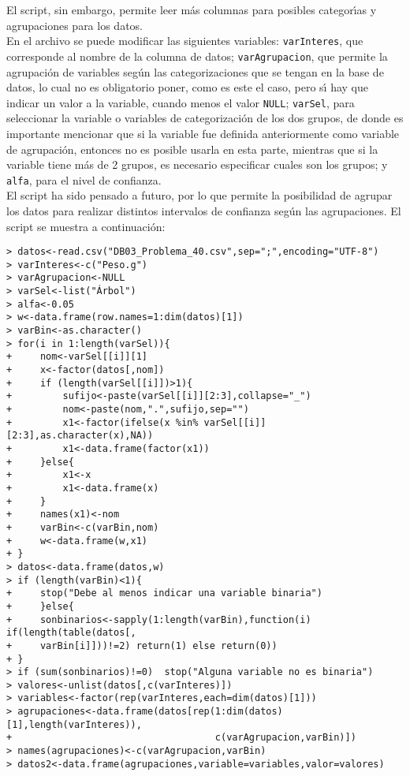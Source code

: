 \begin{solucion}
 El script, sin embargo, permite leer m\'as columnas para posibles categor\'{\i}as y agrupaciones para los datos. \\
 En el archivo se puede modificar las siguientes variables: \texttt{varInteres}, que corresponde al nombre de la columna de datos; \texttt{varAgrupacion}, que permite la agrupaci\'on de variables seg\'un las categorizaciones que se tengan en la base de datos, lo cual no es obligatorio poner, como es este el caso, pero s\'{\i} hay que indicar un valor a la variable, cuando menos el valor \texttt{NULL}; \texttt{varSel}, para seleccionar la variable o variables de categorizaci\'on de los dos grupos, de donde es importante mencionar que si la variable fue definida anteriormente como variable de agrupaci\'on, entonces no es posible usarla en esta parte, mientras que si la variable tiene m\'as de 2 grupos, es necesario especificar cuales son los grupos; y \texttt{alfa}, para el nivel de confianza. \\
 El script ha sido pensado a futuro, por lo que permite la posibilidad de agrupar los datos para realizar distintos intervalos de confianza seg\'un las agrupaciones. El script se muestra a continuaci\'on:
 \begin{verbatim}
> datos<-read.csv("DB03_Problema_40.csv",sep=";",encoding="UTF-8")
> varInteres<-c("Peso.g")
> varAgrupacion<-NULL
> varSel<-list("Árbol")
> alfa<-0.05
> w<-data.frame(row.names=1:dim(datos)[1])
> varBin<-as.character()
> for(i in 1:length(varSel)){
+     nom<-varSel[[i]][1]
+     x<-factor(datos[,nom])
+     if (length(varSel[[i]])>1){
+         sufijo<-paste(varSel[[i]][2:3],collapse="_")
+         nom<-paste(nom,".",sufijo,sep="")
+         x1<-factor(ifelse(x %in% varSel[[i]][2:3],as.character(x),NA))
+         x1<-data.frame(factor(x1))
+     }else{
+         x1<-x
+         x1<-data.frame(x)
+     }
+     names(x1)<-nom
+     varBin<-c(varBin,nom)
+     w<-data.frame(w,x1)
+ }
> datos<-data.frame(datos,w)
> if (length(varBin)<1){
+     stop("Debe al menos indicar una variable binaria")
+     }else{
+     sonbinarios<-sapply(1:length(varBin),function(i) if(length(table(datos[,
+     varBin[i]]))!=2) return(1) else return(0))
+ }
> if (sum(sonbinarios)!=0)  stop("Alguna variable no es binaria")
> valores<-unlist(datos[,c(varInteres)])
> variables<-factor(rep(varInteres,each=dim(datos)[1]))
> agrupaciones<-data.frame(datos[rep(1:dim(datos)[1],length(varInteres)),
+                                    c(varAgrupacion,varBin)])
> names(agrupaciones)<-c(varAgrupacion,varBin)
> datos2<-data.frame(agrupaciones,variable=variables,valor=valores)

\end{verbatim}
\end{solucion}
